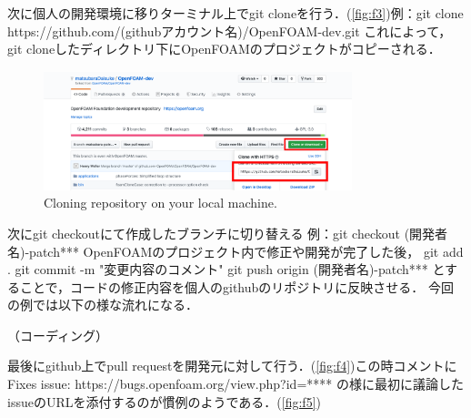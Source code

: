 \documentclass{ltjoc}
\begin{document}
次に個人の開発環境に移りターミナル上でgit cloneを行う．(\autoref{fig:f3})例：git clone https://github.com/(githubアカウント名)/OpenFOAM-dev.git
これによって，git cloneしたディレクトリ下にOpenFOAMのプロジェクトがコピーされる．
\begin{figure}[htbp]
\centering
\includegraphics[width=0.8\textwidth]{fig/fig-f3.png}
\caption{Cloning repository on your local machine.}
\label{fig:f3}
\end{figure}

次にgit checkoutにて作成したブランチに切り替える 例：git checkout (開発者名)-patch***
OpenFOAMのプロジェクト内で修正や開発が完了した後，
git add . git commit -m "変更内容のコメント" git push origin (開発者名)-patch***
とすることで，コードの修正内容を個人のgithubのリポジトリに反映させる．
今回の例では以下の様な流れになる．

\begin{shbox}
  \shuser{}
  \shmachine{}
\end{shbox}

（コーディング）

\begin{shbox}
  \shuser{}
\end{shbox}



最後にgithub上でpull requestを開発元に対して行う．(\autoref{fig:f4})この時コメントに
Fixes issue:
https://bugs.openfoam.org/view.php?id=****
の様に最初に議論したissueのURLを添付するのが慣例のようである．(\autoref{fig:f5})
\end{document}
